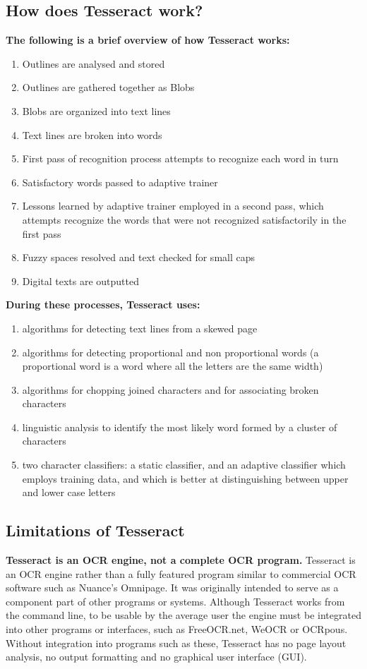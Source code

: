 \subsection{How does Tesseract work?}
\textbf{The following is a brief overview of how Tesseract works:}
\begin{enumerate}
\item Outlines are analysed and stored 
\item Outlines are gathered together as Blobs
\item Blobs are organized into text lines
\item Text lines are broken into words 
\item First pass of recognition process attempts to recognize each word in turn 
\item Satisfactory words passed to adaptive trainer 
\item Lessons learned by adaptive trainer employed in a second pass, which attempts
recognize the words that were not recognized satisfactorily in the first pass 
\item Fuzzy spaces resolved and text checked for small caps
\item Digital texts are outputted 
\end{enumerate}
\textbf{During these processes, Tesseract uses:}
\begin{enumerate}
\item algorithms for detecting text lines from a skewed page 
\item algorithms for detecting proportional and non proportional words (a proportional
word is a word where all the letters are the same width) 
\item algorithms for chopping joined characters and for associating broken characters 
\item linguistic analysis to identify the most likely word formed by a cluster of
characters 
\item two character classifiers: a static classifier, and an adaptive classifier which
employs training data, and which is better at distinguishing between upper and
lower case letters 
\end{enumerate}

\subsection{Limitations of Tesseract}
\textbf{Tesseract is an OCR engine, not a complete OCR program.}
Tesseract is an OCR engine rather than a fully featured program similar to commercial
OCR software such as Nuance’s Omnipage. It was originally intended to serve as a
component part of other programs or systems. Although Tesseract works from the 
command line, to be usable by the average user the engine must be integrated into
other programs or interfaces, such as FreeOCR.net, WeOCR or OCRpous. Without
integration into programs such as these, Tesseract has no page layout analysis, no
output formatting and no graphical user interface (GUI).
